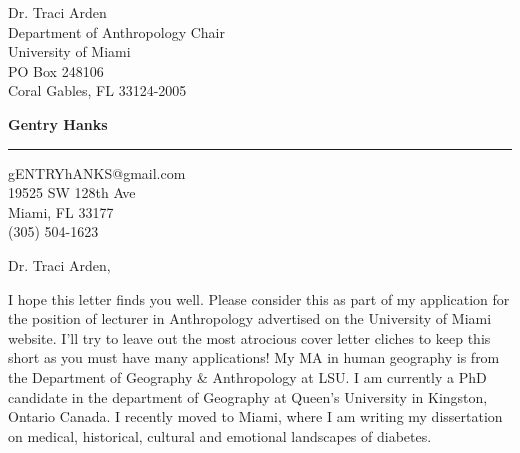 \documentclass[10pt]{letter} %
\begin{document}
\begin{letter}{Dr. Traci Arden \\
Department of Anthropology Chair \\
University of Miami \\
PO Box 248106 \\
Coral Gables, FL 33124-2005}


\begin{flushright}
\large\bf Gentry Hanks \\ %
\vspace{15pt} \hrule height 1pt %
gENTRYhANKS@gmail.com \\
19525 SW 128th Ave \\ 
Miami, FL 33177 \\ 
(305) 504-1623 \\%
\end{flushright} 

\signature{Gentry Hanks} %


\opening{Dr. Traci Arden,} 

I hope this letter finds you well. Please consider this as part of my application for the position of lecturer in Anthropology advertised on the University of Miami website. I'll try to leave out the most atrocious cover letter cliches to keep this short as you must have many applications! My MA in human geography is from the Department of Geography \& Anthropology at LSU. I am currently a PhD candidate in the department of Geography at Queen's University in Kingston, Ontario Canada. I recently moved to Miami, where I am writing my dissertation on medical, historical, cultural and emotional landscapes of diabetes.


\end{letter}
\end{document}
